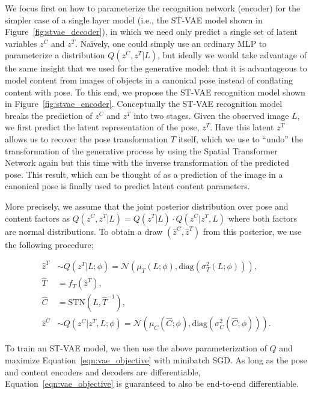 We focus first on how to parameterize the recognition network (encoder) for the simpler case of a single layer model (i.e., the ST-VAE model
shown in Figure~\ref{fig:stvae_decoder}), in which we need only predict a single set of latent variables $z^C$ and $z^T$.
Na\"{i}vely, one could 
simply use an ordinary MLP to parameterize a distribution $Q(z^C, z^T | L)$, but ideally we would take advantage of the same
 insight that we used for the generative model: that it is advantageous to model content from images of objects in a canonical pose instead
 of conflating content with pose.  To this end, we propose the ST-VAE recognition model shown in Figure~\ref{fig:stvae_encoder}. 
Conceptually the ST-VAE recognition model breaks the prediction of $z^C$ and $z^T$ into two stages.  Given the observed image $L$,
we first predict the latent representation of the pose, $z^T$.  Have this latent $z^T$ allows us to recover the pose transformation 
$T$ itself, which we use to ``undo'' the transformation of the generative process
by using the Spatial Transformer Network again but this time with the inverse transformation of the predicted pose.  This result, which can be
thought of as a prediction of the image in a canonical pose is finally used to predict latent content parameters.


More precisely, we assume that the joint posterior distribution over
pose and content factors as
$Q(z^C, z^T | L) = Q(z^T |L)\cdot Q(z^C | z^T, L)$ where both factors are normal distributions.  
To obtain a draw $(\hat{z}^C, \hat{z}^T)$ from this posterior, we use the following procedure:\vspace{-4mm}

{\footnotesize
\begin{align*}
\hat{z}^T &\sim Q(z^T |L; \phi) = \mathcal{N}(\mu_{T}(L; \phi), \mbox{diag}(\sigma_{T}^2(L; \phi))), \\
\hat{T} &= f_T(\hat{z}^T), \\
\hat{C} &= \mbox{STN}(L, \hat{T}^{-1}), \\
\hat{z}^C &\sim Q(z^C | z^T, L; \phi) =  \mathcal{N}(\mu_{C}(\hat{C}; \phi), \mbox{diag}(\sigma_{C}^2(\hat{C}; \phi))).
\end{align*}\vspace{-2mm}
}

To train an ST-VAE model, we then use the above parameterization of $Q$ and maximize Equation~\ref{eqn:vae_objective} with minibatch
SGD.
As long as the pose and content encoders and decoders  are differentiable, Equation~\ref{eqn:vae_objective} is guaranteed to also be 
end-to-end differentiable.

